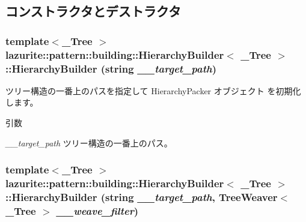 \subsection{コンストラクタとデストラクタ}
\hypertarget{classlazurite_1_1pattern_1_1building_1_1_hierarchy_builder_3_01___tree_01_4_a38d22da8097b1cb2703979c62c69e0cd}{
\subsubsection[{HierarchyBuilder}]{\setlength{\rightskip}{0pt plus 5cm}template$<$\_\-Tree $>$ lazurite::pattern::building::HierarchyBuilder$<$ \_\-Tree $>$::HierarchyBuilder (string {\em \_\-\_\-target\_\-path})}}
\label{classlazurite_1_1pattern_1_1building_1_1_hierarchy_builder_3_01___tree_01_4_a38d22da8097b1cb2703979c62c69e0cd}
ツリー構造の一番上のパスを指定して HierarchyPacker オブジェクト を初期化します。 
\begin{DoxyParams}{引数}
\item[{\em \_\-\_\-target\_\-path}]ツリー構造の一番上のパス。 \end{DoxyParams}
\hypertarget{classlazurite_1_1pattern_1_1building_1_1_hierarchy_builder_3_01___tree_01_4_a4166ce2beb0880a9d57696de197e5854}{
\subsubsection[{HierarchyBuilder}]{\setlength{\rightskip}{0pt plus 5cm}template$<$\_\-Tree $>$ lazurite::pattern::building::HierarchyBuilder$<$ \_\-Tree $>$::HierarchyBuilder (string {\em \_\-\_\-target\_\-path}, \/  TreeWeaver$<$ \_\-Tree $>$ {\em \_\-\_\-weave\_\-filter})}}
\label{classlazurite_1_1pattern_1_1building_1_1_hierarchy_builder_3_01___tree_01_4_a4166ce2beb0880a9d57696de197e5854}

